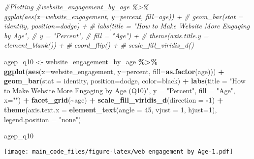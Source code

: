 \documentclass[
]{article}
\newenvironment{Shaded}{\begin{snugshade}}{\end{snugshade}}
\newcommand{\AttributeTok}[1]{\textcolor[rgb]{0.13,0.29,0.53}{#1}}
\newcommand{\CommentTok}[1]{\textcolor[rgb]{0.56,0.35,0.01}{\textit{#1}}}
\newcommand{\DecValTok}[1]{\textcolor[rgb]{0.00,0.00,0.81}{#1}}
\newcommand{\FunctionTok}[1]{\textcolor[rgb]{0.13,0.29,0.53}{\textbf{#1}}}
\newcommand{\NormalTok}[1]{#1}
\newcommand{\OtherTok}[1]{\textcolor[rgb]{0.56,0.35,0.01}{#1}}
\newcommand{\SpecialCharTok}[1]{\textcolor[rgb]{0.81,0.36,0.00}{\textbf{#1}}}
\newcommand{\StringTok}[1]{\textcolor[rgb]{0.31,0.60,0.02}{#1}}
\begin{document}
\begin{Shaded}
\begin{Highlighting}[]
\CommentTok{\#Plotting }
\CommentTok{\#website\_engagement\_by\_age \%\textgreater{}\% ggplot(aes(x=website\_engagement, y=percent, fill=age)) +}
\CommentTok{\#  geom\_bar(stat = \textquotesingle{}identity\textquotesingle{}, position=\textquotesingle{}dodge\textquotesingle{}) +}
\CommentTok{\#  labs(title = "How to Make Website More Engaging by Age",}
\CommentTok{\#       y = "Percent",}
\CommentTok{\#       fill = "Age") +}
\CommentTok{\#  theme(axis.title.y = element\_blank()) +}
\CommentTok{\#  coord\_flip() +}
\CommentTok{\#  scale\_fill\_viridis\_d()}

\NormalTok{agep\_q10 }\OtherTok{\textless{}{-}}\NormalTok{ website\_engagement\_by\_age }\SpecialCharTok{\%\textgreater{}\%} \FunctionTok{ggplot}\NormalTok{(}\FunctionTok{aes}\NormalTok{(}\AttributeTok{x=}\NormalTok{website\_engagement, }\AttributeTok{y=}\NormalTok{percent, }\AttributeTok{fill=}\FunctionTok{as.factor}\NormalTok{(age))) }\SpecialCharTok{+}
  \FunctionTok{geom\_bar}\NormalTok{(}\AttributeTok{stat =} \StringTok{\textquotesingle{}identity\textquotesingle{}}\NormalTok{, }\AttributeTok{position=}\StringTok{\textquotesingle{}dodge\textquotesingle{}}\NormalTok{, }\AttributeTok{color=}\StringTok{\textquotesingle{}black\textquotesingle{}}\NormalTok{) }\SpecialCharTok{+}
  \FunctionTok{labs}\NormalTok{(}\AttributeTok{title =} \StringTok{"How to Make Website More Engaging by Age (Q10)"}\NormalTok{,}
       \AttributeTok{y =} \StringTok{"Percent"}\NormalTok{,}
       \AttributeTok{fill =} \StringTok{"Age"}\NormalTok{,}
       \AttributeTok{x=}\StringTok{""}\NormalTok{) }\SpecialCharTok{+}
  \FunctionTok{facet\_grid}\NormalTok{(}\SpecialCharTok{\textasciitilde{}}\NormalTok{age) }\SpecialCharTok{+}
  \FunctionTok{scale\_fill\_viridis\_d}\NormalTok{(}\AttributeTok{direction =} \SpecialCharTok{{-}}\DecValTok{1}\NormalTok{) }\SpecialCharTok{+}
  \FunctionTok{theme}\NormalTok{(}\AttributeTok{axis.text.x =} \FunctionTok{element\_text}\NormalTok{(}\AttributeTok{angle =} \DecValTok{45}\NormalTok{, }\AttributeTok{vjust =} \DecValTok{1}\NormalTok{, }\AttributeTok{hjust=}\DecValTok{1}\NormalTok{),}
        \AttributeTok{legend.position =} \StringTok{"none"}\NormalTok{) }

\NormalTok{agep\_q10}
\end{Highlighting}
\end{Shaded}

\texttt{[image: main\_code\_files/figure-latex/web engagement by Age-1.pdf]}
\end{document}
